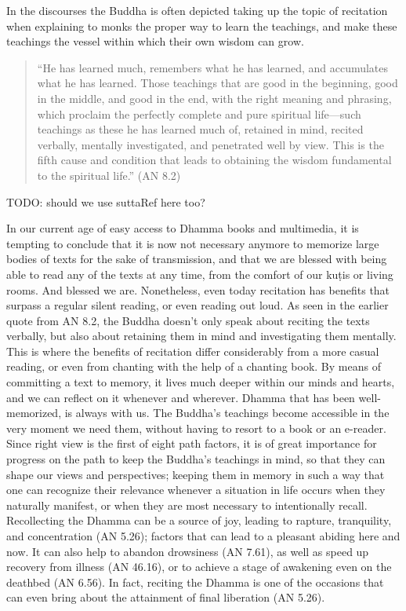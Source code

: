 In the discourses the Buddha is often depicted taking up the topic of recitation when explaining to monks the proper way to learn the teachings, and make these teachings the vessel within which their own wisdom can grow.\\

\begin{quote}
  ``He has learned much, remembers what he has learned, and accumulates what he has learned. Those teachings that are good in the beginning, good in the middle, and good in the end, with the right meaning and phrasing, which proclaim the perfectly complete and pure spiritual life—such teachings as these he has learned much of, retained in mind, recited verbally, mentally investigated, and penetrated well by view. This is the fifth cause and condition that leads to obtaining the wisdom fundamental to the spiritual life.'' (AN 8.2)\\
\end{quote}

TODO: should we use suttaRef here too?

In our current age of easy access to Dhamma books and multimedia, it is tempting to conclude that it is now not necessary anymore to memorize large bodies of texts for the sake of transmission, and that we are blessed with being able to read any of the texts at any time, from the comfort of our kuṭis or living rooms. And blessed we are. Nonetheless, even today recitation has benefits that surpass a regular silent reading, or even reading out loud. As seen in the earlier quote from AN 8.2, the Buddha doesn't only speak about reciting the texts verbally, but also about retaining them in mind and investigating them mentally. This is where the benefits of recitation differ considerably from a more casual reading, or even from chanting with the help of a chanting book. By means of committing a text to memory, it lives much deeper within our minds and hearts, and we can reflect on it whenever and wherever. Dhamma that has been well-memorized, is always with us. The Buddha's teachings become accessible in the very moment we need them, without having to resort to a book or an e-reader.\\

Since right view is the first of eight path factors, it is of great importance for progress on the path to keep the Buddha's teachings in mind, so that they can shape our views and perspectives; keeping them in memory in such a way that one can recognize their relevance whenever a situation in life occurs when they naturally manifest, or when they are most necessary to intentionally recall. Recollecting the Dhamma can be a source of joy, leading to rapture, tranquility, and concentration (AN 5.26); factors that can lead to a pleasant abiding here and now. It can also help to abandon drowsiness (AN 7.61), as well as speed up recovery from illness (AN 46.16), or to achieve a stage of awakening even on the deathbed (AN 6.56). In fact, reciting the Dhamma is one of the occasions that can even bring about the attainment of final liberation (AN 5.26).\\

